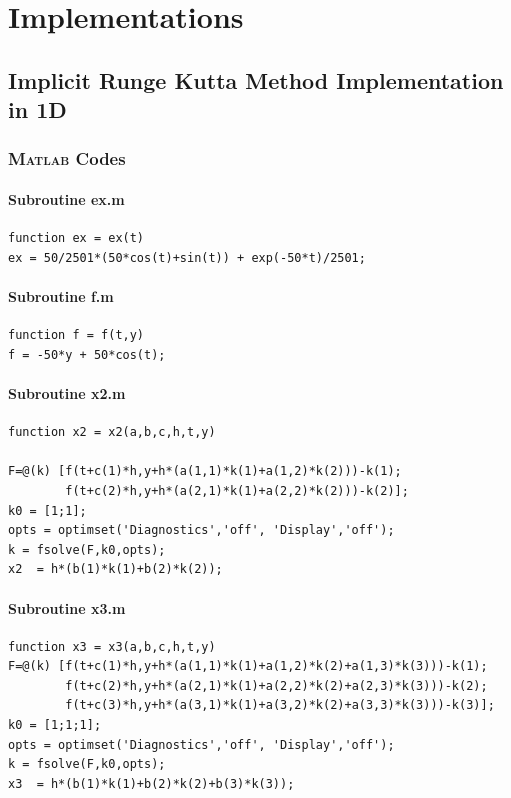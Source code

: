 \documentclass[a4paper,oneside]{book}
\numberwithin{equation}{chapter}
\begin{document}
\chapter{Implementations}
\section{Implicit Runge Kutta Method Implementation in 1D}
\subsection{\textsc{Matlab} Codes}
\subsubsection{Subroutine ex.m}
\begin{verbatim}
function ex = ex(t)
ex = 50/2501*(50*cos(t)+sin(t)) + exp(-50*t)/2501;
\end{verbatim}
\subsubsection{Subroutine f.m}
\begin{verbatim}
function f = f(t,y)
f = -50*y + 50*cos(t);
\end{verbatim}
\subsubsection{Subroutine x2.m}
\begin{verbatim}
function x2 = x2(a,b,c,h,t,y)

F=@(k) [f(t+c(1)*h,y+h*(a(1,1)*k(1)+a(1,2)*k(2)))-k(1);
        f(t+c(2)*h,y+h*(a(2,1)*k(1)+a(2,2)*k(2)))-k(2)];
k0 = [1;1];
opts = optimset('Diagnostics','off', 'Display','off');
k = fsolve(F,k0,opts);
x2  = h*(b(1)*k(1)+b(2)*k(2));
\end{verbatim}
\subsubsection{Subroutine x3.m}
\begin{verbatim}
function x3 = x3(a,b,c,h,t,y)
F=@(k) [f(t+c(1)*h,y+h*(a(1,1)*k(1)+a(1,2)*k(2)+a(1,3)*k(3)))-k(1);
        f(t+c(2)*h,y+h*(a(2,1)*k(1)+a(2,2)*k(2)+a(2,3)*k(3)))-k(2);
        f(t+c(3)*h,y+h*(a(3,1)*k(1)+a(3,2)*k(2)+a(3,3)*k(3)))-k(3)];
k0 = [1;1;1]; 
opts = optimset('Diagnostics','off', 'Display','off');
k = fsolve(F,k0,opts);
x3  = h*(b(1)*k(1)+b(2)*k(2)+b(3)*k(3));
\end{verbatim}
\end{document}
